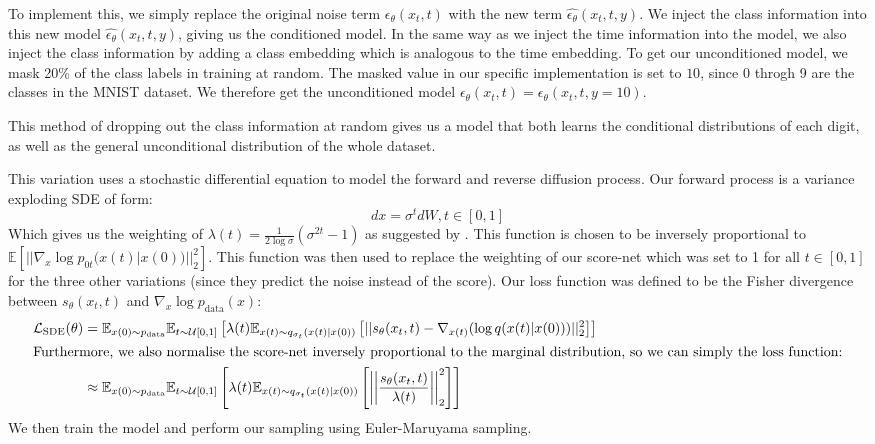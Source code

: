 To implement this, we simply replace the original noise term $\epsilon_\theta(x_t, t)$ with the new term $\hat{\epsilon_\theta}(x_t, t, y)$.
We inject the class information into this new model $\hat{\epsilon_\theta}(x_t, t, y)$, giving us 
the conditioned model.
In the same way as we inject the time information into the model, we also inject the class information by adding a class embedding
which is analogous to the time embedding.
To get our unconditioned model, we mask 20\% of the class labels in training at random.
The masked value in our specific implementation is set to $10$, since 0 throgh 9 are 
the classes in the MNIST dataset.
We therefore get the unconditioned model $\epsilon_\theta(x_t, t) = \epsilon_\theta(x_t, t, y=10)$.

This method of dropping out the class information at random gives us a model
that both learns the conditional distributions of each digit, as well as the
general unconditional distribution of the whole dataset.


This variation uses a stochastic differential equation to model the forward and reverse diffusion process. 
Our forward process is a variance exploding SDE of form:
\begin{equation}
  dx = \sigma ^ t dW, t \in [0, 1]
\end{equation}
Which gives us the weighting of
$\lambda(t) = \frac{1}{2 \log \sigma} (\sigma^{2t}-1)$ as suggested by \cite{yang_song}.
This function is chosen to be inversely proportional to $\mathbb{E}[||\nabla_x \log p_{0t}(x(t) | x(0))||^2_2]$.
This function was then used to replace the weighting of our score-net
which was set to 1 for all $t \in [0, 1]$ for the three other variations (since they predict the noise instead of the score).
Our loss function was defined to be the Fisher divergence between $s_\theta(x_t, t)$ and $\nabla_x \log p_{\text{data}}(x)$:
\begin{align}
  \mathcal{L}_\text{SDE}(\theta) &= \mathbb{E}_{x(0) \sim p_\text{data}} \mathbb{E}_{t \sim \mathcal{U}[0, 1]} \left[ 
  \lambda(t) \mathbb{E}_{x(t) \sim q_{\sigma_t}(x(t) | x(0))} \left[
    ||s_\theta (x_t, t) - \nabla_{x(t)} (\log q(x(t) | x(0)))||^2_2
    \right]\right]\\
  \intertext{Furthermore, we also normalise the score-net
  inversely proportional to the marginal distribution, so we can simply the loss function:}
    &\approx \mathbb{E}_{x(0) \sim p_\text{data}} \mathbb{E}_{t \sim \mathcal{U}[0, 1]} \left[ 
  \lambda(t) \mathbb{E}_{x(t) \sim q_{\sigma_t}(x(t) | x(0))} \left[
    \left|\left|\frac{s_\theta(x_t, t)}{\lambda(t)}\right|\right|^2_2
    \right]\right]
\end{align}
We then train the model and perform our sampling using Euler-Maruyama sampling.

